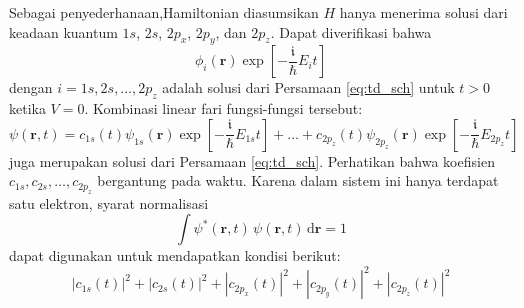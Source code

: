 \documentclass[a4paper,bahasa]{paper}
\renewcommand{\imath}{\mathfrak{i}}
\begin{document}
Sebagai penyederhanaan,Hamiltonian diasumsikan $H$ hanya menerima solusi dari
keadaan kuantum $1s$, $2s$, $2p_{x}$, $2p_{y}$, dan $2p_{z}$.
Dapat diverifikasi bahwa
%
\begin{equation}
\phi_{i}(\mathbf{r})\exp\left[ -\frac{\imath}{\hbar} E_{i}t \right]
\end{equation}
%
dengan $i = 1s, 2s, \ldots, 2p_{z}$ adalah solusi dari Persamaan \eqref{eq:td_sch}
untuk $t > 0$ ketika $V = 0$.
Kombinasi linear fari fungsi-fungsi tersebut:
\begin{equation}
\psi(\mathbf{r},t) =
c_{1s}(t) \psi_{1s}(\mathbf{r}) \exp\left[-\frac{\imath}{\hbar} E_{1s}t\right]
+ \ldots +
c_{2p_{z}}(t) \psi_{2p_{z}}(\mathbf{r}) \exp\left[-\frac{\imath}{\hbar} E_{2p_{z}}t\right]
\end{equation}
juga merupakan solusi dari Persamaan \eqref{eq:td_sch}.
Perhatikan bahwa koefisien $c_{1s}, c_{2s}, \ldots, c_{2p_{z}}$ bergantung pada waktu.
%
Karena dalam sistem ini hanya terdapat satu elektron, syarat normalisasi
\begin{equation}
\int \psi^{*}(\mathbf{r},t)\,\psi(\mathbf{r},t)\,\mathrm{d}\mathbf{r} = 1
\end{equation}
dapat digunakan untuk mendapatkan kondisi berikut:
\begin{equation}
\left| c_{1s}(t) \right|^2 + \left| c_{2s}(t) \right|^2 +
\left| c_{2p_{x}}(t) \right|^2 + \left| c_{2p_{y}}(t) \right|^2 +
\left| c_{2p_{z}}(t) \right|^2
\end{equation}
\end{document}
